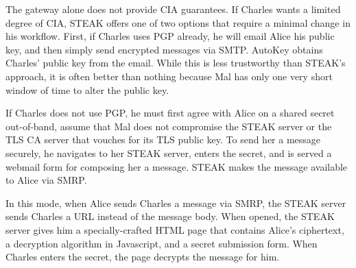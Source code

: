 The gateway alone does not provide CIA guarantees.  If Charles wants a limited degree of CIA, STEAK offers one of two options that require a minimal change in his workflow.  First, if Charles uses PGP already, he will email Alice his public key, and then simply send encrypted messages via SMTP.  AutoKey obtains Charles’ public key from the email.  While this is less trustworthy than STEAK’s approach, it is often better than nothing because Mal has only one very short window of time to alter the public key.

If Charles does not use PGP, he must first agree with Alice on a shared secret out-of-band, assume that Mal does not compromise the STEAK server or the TLS CA server that vouches for its TLS public key.  To send her a message securely, he navigates to her STEAK server, enters the secret, and is served a webmail form for composing her a message.  STEAK makes the message available to Alice via SMRP.

In this mode, when Alice sends Charles a message via SMRP, the STEAK server sends Charles a URL instead of the message body.  When opened, the STEAK server gives him a specially-crafted HTML page that contains Alice’s ciphertext, a decryption algorithm in Javascript, and a secret submission form.  When Charles enters the secret, the page decrypts the message for him.
